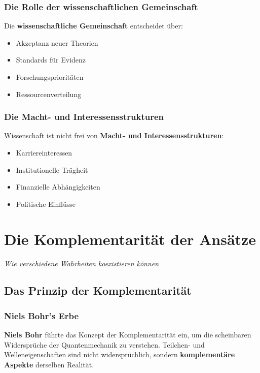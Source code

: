 \documentclass[12pt,a4paper]{report}
\begin{document}
	\subsection{Die Rolle der wissenschaftlichen Gemeinschaft}
	
	Die \textbf{wissenschaftliche Gemeinschaft} entscheidet über:
	
	\begin{itemize}
		\item Akzeptanz neuer Theorien
		\item Standards für Evidenz
		\item Forschungsprioritäten
		\item Ressourcenverteilung
	\end{itemize}
	
	\subsection{Die Macht- und Interessensstrukturen}
	
	Wissenschaft ist nicht frei von \textbf{Macht- und Interessensstrukturen}:
	
	\begin{itemize}
		\item Karriereinteressen
		\item Institutionelle Trägheit
		\item Finanzielle Abhängigkeiten
		\item Politische Einflüsse
	\end{itemize}
	
	\chapter{Die Komplementarität der Ansätze}
	\textit{Wie verschiedene Wahrheiten koexistieren können}
	
	\section{Das Prinzip der Komplementarität}
	
	\subsection{Niels Bohr's Erbe}
	
	\textbf{Niels Bohr} führte das Konzept der Komplementarität ein, um die scheinbaren Widersprüche der Quantenmechanik zu verstehen. Teilchen- und Welleneigenschaften sind nicht widersprüchlich, sondern \textbf{komplementäre Aspekte} derselben Realität.
	
\end{document}
